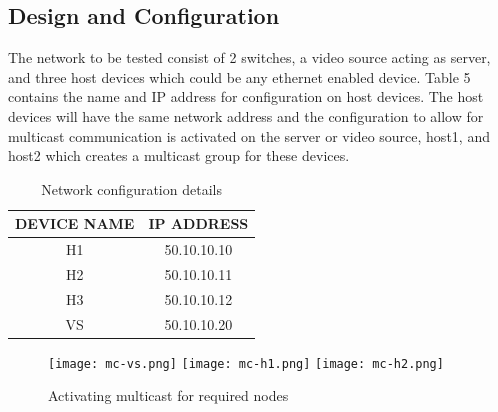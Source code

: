 \documentclass{article}
\begin{document}
\subsection{Design and Configuration}
The network to be tested consist of 2 switches, a video source acting as server, and three host devices which could be any ethernet enabled device. Table 5 contains the name and IP address for configuration on host devices. The host devices will have the same network address and the configuration to allow for multicast communication is activated on the server or video source, host1, and host2 which creates a multicast group for these devices.
    	\begin{table}[h]
        		\centering
        		\begin{tabular}{|c|c|}
            		\hline
            		DEVICE NAME & IP ADDRESS \\
            		\hline
            		H1 & 50.10.10.10 \\
            		H2 & 50.10.10.11 \\
            		H3 & 50.10.10.12 \\
            		VS & 50.10.10.20 \\
            		\hline
        		\end{tabular}
        		\caption{Network configuration details}
        		\label{tab:5}
    	\end{table}
    	\begin{figure}[h]
        		\centering
        		\texttt{[image: mc-vs.png]}
        		\texttt{[image: mc-h1.png]}
        		\texttt{[image: mc-h2.png]}
        		\caption{Activating multicast for required nodes}
        		\label{fig:t4-1}
    	\end{figure}
\end{document}
